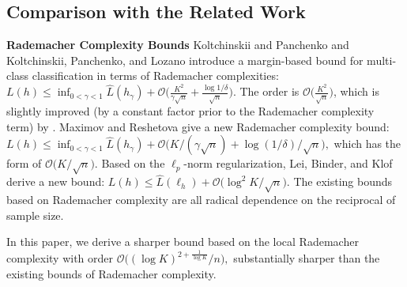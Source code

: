 \documentclass{article}
\begin{document}

\subsection{Comparison with the Related Work}
\textbf{Rademacher Complexity Bounds}
Koltchinskii and Panchenko \cite{koltchinskii2002empirical}
and Koltchinskii, Panchenko, and Lozano \cite{koltchinskii2001some}
introduce a margin-based bound for multi-class classification in terms of Rademacher complexities:
$
  L(h)\leq \inf_{0<\gamma<1}\hat{L}(h_\gamma)+\mathcal{O}\big(\frac{K^2}{\gamma\sqrt{n}}+\frac{\log1/\delta}{\sqrt{n}}\big).
$
The order is $\mathcal{O}\big(\frac{K^2}{\sqrt{n}}\big)$,
which is slightly improved (by a constant factor prior to the Rademacher complexity term)
by \cite{mohri2012foundations,cortes2013multi}.
Maximov and Reshetova \cite{maximov2016tight} give a new Rademacher complexity bound:
$
  L(h)\leq \inf_{0<\gamma<1}\hat{L}(h_\gamma)+\mathcal{O}
  \big({K}/{(\gamma\sqrt{n})}+{\log(1/\delta)}/{\sqrt{n}}\big),
$
which has the form of $\mathcal{O}\big({K}/{\sqrt{n}}\big)$.
Based on the $\ell_p$-norm regularization,
Lei, Binder, and Klof \cite{lei2015multi} derive a new bound:
$
   L(h)\leq  \hat{L}(\ell_h) +\mathcal{O}\big({\log^2 K}/{\sqrt{n}}\big).
$
The existing bounds based on Rademacher complexity are all radical dependence
on the reciprocal of sample size.

In this paper,
we derive a sharper bound based on the local Rademacher complexity with order
$
\mathcal{O}\big({(\log K)^{2+\frac{1}{\log K}}}/{n}\big),
$
substantially sharper
than the existing bounds of  Rademacher complexity.
\end{document}
